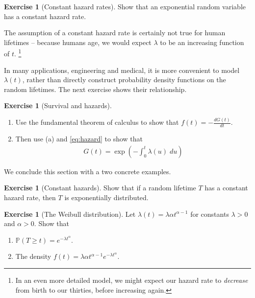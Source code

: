 \documentclass[11pt]{article}
\theoremstyle{definition}
\newtheorem{exercise}[]{Exercise}
\renewcommand{\P}{\mathbb{P}}
\begin{document}
\begin{exercise}[Constant hazard rates]
Show that an exponential random variable has a constant hazard rate.
\end{exercise}

The assumption of a constant hazard rate is certainly not true
for human lifetimes -- because humans age,
we would expect $\lambda$ to be an increasing function of $t$.
\footnote{In an even more detailed model, we might
expect our hazard rate to \textit{decrease} from birth to our thirties,
before increasing again. }

In many applications, engineering and medical, it is more
convenient to model
$\lambda(t)$, rather than directly construct probability density functions
on the random lifetimes.
The next exercise shows their relationship.

\begin{exercise}[Survival and hazards]

$\quad$

\begin{enumerate}[label=(\alph*)]
  \item Use the fundamental theorem of calculus to show that
  $f(t) = -\frac{dG(t)}{dt}$.
  \item Then use (a) and \eqref{eq:hazard} to show that
  \begin{align*}
    G(t) = \exp\left(-\int_0^t\lambda(u)\;du\right)
  \end{align*}
\end{enumerate}

\end{exercise}


We conclude this section with a two concrete examples.
\begin{exercise}[Constant hazards]
Show that if a random lifetime $T$ has a constant hazard rate,
then $T$ is exponentially distributed.
\end{exercise}

\begin{exercise}[The Weibull distribution]
Let $\lambda(t) = \lambda \alpha t^{\alpha -1}$ for constants $\lambda > 0$
and $\alpha > 0$.
Show that
\begin{enumerate}[label = (\alph*)]
  \item $\P(T \geq t) = e^{-\lambda t^\alpha}$.
  \item The density $f(t) = \lambda \alpha t^{\alpha -1}e^{-\lambda t^\alpha}$.
\end{enumerate}
\end{exercise}
\end{document}
